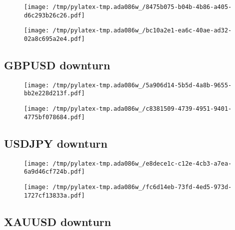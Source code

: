 \documentclass{article}%
\begin{document}
\begin{figure}[htbp]%
\centering%
\texttt{[image: /tmp/pylatex-tmp.ada086w\_/8475b075-b04b-4b86-a405-d6c293b26c26.pdf]}%
\end{figure}

%


\begin{figure}[htbp]%
\centering%
\texttt{[image: /tmp/pylatex-tmp.ada086w\_/bc10a2e1-ea6c-40ae-ad32-02a8c695a2e4.pdf]}%
\end{figure}

%
\newpage %
\subsection{GBPUSD downturn}%
\label{subsec:GBPUSDdownturn}%


\begin{figure}[htbp]%
\centering%
\texttt{[image: /tmp/pylatex-tmp.ada086w\_/5a906d14-5b5d-4a8b-9655-bb2e228d213f.pdf]}%
\end{figure}

%


\begin{figure}[htbp]%
\centering%
\texttt{[image: /tmp/pylatex-tmp.ada086w\_/c8381509-4739-4951-9401-4775bf078684.pdf]}%
\end{figure}

%
\newpage %
\subsection{USDJPY downturn}%
\label{subsec:USDJPYdownturn}%


\begin{figure}[htbp]%
\centering%
\texttt{[image: /tmp/pylatex-tmp.ada086w\_/e8dece1c-c12e-4cb3-a7ea-6a9d46cf724b.pdf]}%
\end{figure}

%


\begin{figure}[htbp]%
\centering%
\texttt{[image: /tmp/pylatex-tmp.ada086w\_/fc6d14eb-73fd-4ed5-973d-1727cf13833a.pdf]}%
\end{figure}

%
\newpage %
\subsection{XAUUSD downturn}%
\label{subsec:XAUUSDdownturn}%
\end{document}
